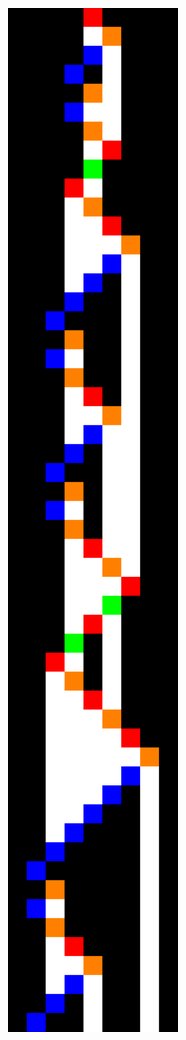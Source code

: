 \begin{figure}
  \centering
  \begin{subfigure}[m]{0.125\textwidth}
    \centering
    \includegraphics[width=\textwidth]{space-time-diagrams/finite-automata-reduction-counter4.pdf}

\end{subfigure}
\end{figure}
